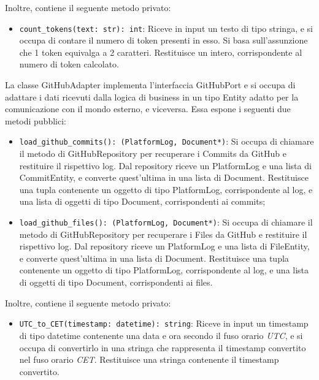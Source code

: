 Inoltre, contiene il seguente metodo privato:
\begin{itemize}
    \item \texttt{count\_tokens(text: str): int}: Riceve in input un testo di tipo stringa, e si occupa di contare il numero di token presenti in esso. Si basa sull'assunzione che 1 token equivalga a 2 caratteri. Restituisce un intero, corrispondente al numero di token calcolato.
\end{itemize}

\label{sec:github_adapter}
La classe GitHubAdapter implementa l'interfaccia GitHubPort e si occupa di adattare i dati ricevuti dalla logica di business in un tipo Entity adatto per la comunicazione con il mondo esterno, e viceversa. Essa espone i seguenti due metodi pubblici:
\begin{itemize}
    \item \texttt{load\_github\_commits(): (PlatformLog, Document*)}: Si occupa di chiamare il metodo di GitHubRepository per recuperare i Commits da GitHub e restituire il rispettivo log. Dal repository riceve un PlatformLog e una lista di CommitEntity, e converte quest'ultima in una lista di Document. Restituisce una tupla contenente un oggetto di tipo PlatformLog, corrispondente al log, e una lista di oggetti di tipo Document, corrispondenti ai commits;
    \item \texttt{load\_github\_files(): (PlatformLog, Document*)}: Si occupa di chiamare il metodo di GitHubRepository per recuperare i Files da GitHub e restituire il rispettivo log. Dal repository riceve un PlatformLog e una lista di FileEntity, e converte quest'ultima in una lista di Document. Restituisce una tupla contenente un oggetto di tipo PlatformLog, corrispondente al log, e una lista di oggetti di tipo Document, corrispondenti ai files.
\end{itemize}
Inoltre, contiene il seguente metodo privato:
\begin{itemize}
    \item \texttt{UTC\_to\_CET(timestamp: datetime): string}: Riceve in input un timestamp di tipo datetime contenente una data e ora secondo il fuso orario \emph{UTC}, e si occupa di convertirlo in una stringa che rappresenta il timestamp convertito nel fuso orario \emph{CET}. Restituisce una stringa contenente il timestamp convertito.
\end{itemize}

